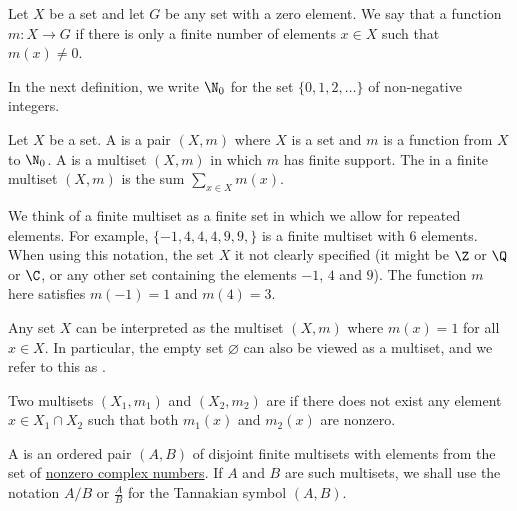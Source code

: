 \documentclass[a4paper]{article}
\begin{document}
\begin{definition}
Let $X$ be a set and let $G$ be any set with a zero element. We say that a function $m: X \to G$  if there is only a finite number of elements $x \in X$ such that $m(x) \neq 0$. 
\end{definition}

In the next definition, we write $\N_0$ for the set $\{  0, 1, 2, \ldots  \}$ of non-negative integers.

\begin{definition}
Let $X$ be a set. A  is a pair $(X, m)$ where $X$ is a set and $m$ is a function from $X$ to $\N_0$. A  is a multiset $(X, m)$ in which $m$ has finite support. The  in a finite multiset $(X, m)$ is the sum $\sum_{x \in X} m(x)$.
\end{definition}

\begin{example}
We think of a finite multiset as a finite set in which we allow for repeated elements. For example, $\{ -1, 4, 4, 4, 9, 9,   \}$ is a finite multiset with 6 elements. When using this notation, the set $X$ it not clearly specified (it might be $\Z$ or $\Q$ or $\C$, or any other set containing the elements $-1$, $4$ and $9$). The function $m$ here satisfies $m(-1) = 1$ and $m(4) = 3$.
\end{example}

\begin{example}
Any set $X$ can be interpreted as the multiset $(X, m)$ where $m(x) = 1$ for all $x \in X$. In particular, the empty set $\varnothing$ can also be viewed as a multiset, and we refer to this as .
\end{example}

\begin{definition}
Two multisets $(X_1, m_1)$ and $(X_2, m_2)$ are  if there does not exist any element $x \in X_1 \cap X_2$ such that both $m_1(x)$ and $m_2(x)$ are nonzero.
\end{definition}

\begin{definition}
A  is an ordered pair $(A, B)$ of disjoint finite multisets with elements from the set of \underline{nonzero complex numbers}. If $A$ and $B$ are such multisets, we shall use the notation $A/B$ or $\frac{A}{B}$ for the Tannakian symbol $(A, B)$.
\end{definition}
\end{document}
